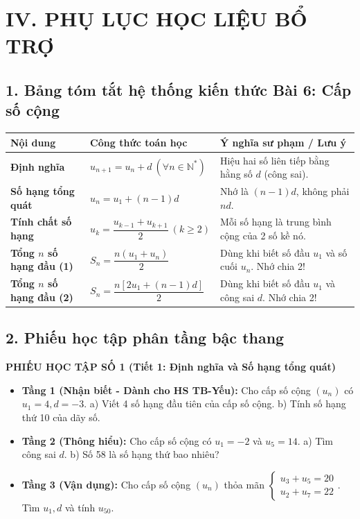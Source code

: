 \documentclass[12pt, a4paper]{article}
\begin{document}
\section*{IV. PHỤ LỤC HỌC LIỆU BỔ TRỢ}  
  
\subsection*{1. Bảng tóm tắt hệ thống kiến thức Bài 6: Cấp số cộng}  
  
\begin{center}  
\small  
\begin{tabularx}{\textwidth}{|p{3.5cm}|X|X|}  
\hline  
\textbf{Nội dung} & \textbf{Công thức toán học} & \textbf{Ý nghĩa sư phạm / Lưu ý} \\ \hline  
\textbf{Định nghĩa} & $u_{n+1} = u_n + d \ (\forall n \in \mathbb{N}^*)$ & Hiệu hai số liên tiếp bằng hằng số $d$ (công sai). \\ \hline  
\textbf{Số hạng tổng quát} & $u_n = u_1 + (n - 1)d$ & Nhớ là $(n - 1)d$, không phải $nd$. \\ \hline  
\textbf{Tính chất số hạng} & $u_k = \dfrac{u_{k-1} + u_{k+1}}{2} \ (k \ge 2)$ & Mỗi số hạng là trung bình cộng của 2 số kề nó. \\ \hline  
\textbf{Tổng $n$ số hạng đầu (1)} & $S_n = \dfrac{n(u_1 + u_n)}{2}$ & Dùng khi biết số đầu $u_1$ và số cuối $u_n$. Nhớ chia 2! \\ \hline  
\textbf{Tổng $n$ số hạng đầu (2)} & $S_n = \dfrac{n[2u_1 + (n - 1)d]}{2}$ & Dùng khi biết số đầu $u_1$ và công sai $d$. Nhớ chia 2! \\ \hline  
\end{tabularx}  
\end{center}  
  
\subsection*{2. Phiếu học tập phân tầng bậc thang}  
  
\noindent \textbf{PHIẾU HỌC TẬP SỐ 1 (Tiết 1: Định nghĩa và Số hạng tổng quát)}  
\begin{itemize}[leftmargin=0.6cm]  
    \item \textbf{Tầng 1 (Nhận biết - Dành cho HS TB-Yếu):}  
    Cho cấp số cộng $(u_n)$ có $u_1 = 4, d = -3$.  
    a) Viết 4 số hạng đầu tiên của cấp số cộng.  
    b) Tính số hạng thứ 10 của dãy số.  
    \item \textbf{Tầng 2 (Thông hiểu):}  
    Cho cấp số cộng có $u_1 = -2$ và $u_5 = 14$.  
    a) Tìm công sai $d$. \quad b) Số 58 là số hạng thứ bao nhiêu?  
    \item \textbf{Tầng 3 (Vận dụng):}  
    Cho cấp số cộng $(u_n)$ thỏa mãn $\begin{cases} u_3 + u_5 = 20 \\ u_2 + u_7 = 22 \end{cases}$. Tìm $u_1, d$ và tính $u_{50}$.  
\end{itemize}  
  
\end{document}
